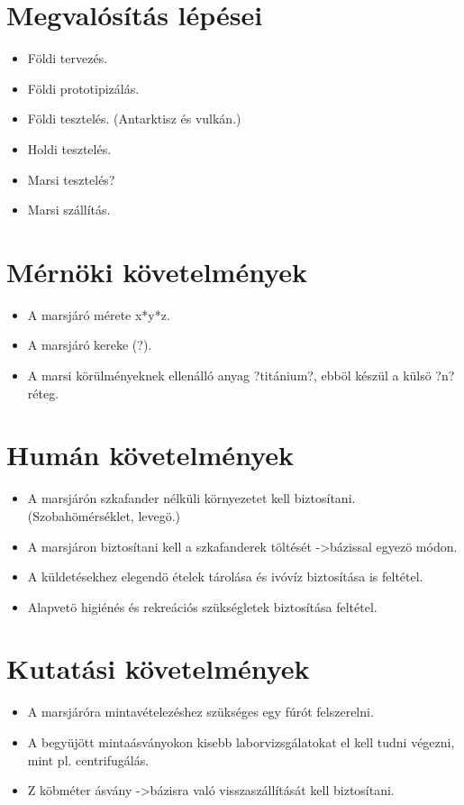 \documentclass{report}
\begin{document}
\section{Megvalósítás lépései}
\begin{itemize}
  \item Földi tervezés.
  \item Földi prototipizálás.
  \item Földi tesztelés. (Antarktisz és vulkán.)
  \item Holdi tesztelés.
  \item Marsi tesztelés?
  \item Marsi szállítás.
\end{itemize}
\section{Mérnöki követelmények}
\begin{itemize}
  \item A marsjáró mérete x*y*z.
  \item A marsjáró kereke (?).
  \item A marsi körülményeknek ellenálló anyag ?titánium?, ebböl készül a külsö ?n? réteg.
\end{itemize}
\section{Humán követelmények}
\begin{itemize}
  \item A marsjárón szkafander nélküli környezetet kell biztosítani. (Szobahömérséklet, levegö.)
  \item A marsjáron biztosítani kell a szkafanderek töltését ->bázissal egyezö módon.
  \item A küldetésekhez elegendö ételek tárolása és ivóvíz biztosítása is feltétel.
  \item Alapvetö higiénés és rekreációs szükségletek biztosítása feltétel.
\end{itemize}
\section{Kutatási követelmények}
\begin{itemize}
  \item A marsjáróra mintavételezéshez szükséges egy fúrót felszerelni.
  \item A begyüjött mintaásványokon kisebb laborvizsgálatokat el kell tudni végezni, mint pl. centrifugálás.
  \item Z köbméter ásvány ->bázisra való visszaszállítását kell biztosítani.
\end{itemize}
\end{document}
